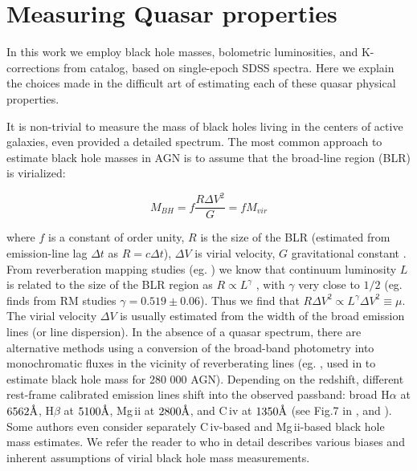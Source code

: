 \documentclass[twocolumn]{aastex62}
\let\oldAA\AA
\renewcommand{\AA}{\text{\normalfont\oldAA}}
\begin{document}
\appendix
\section{Measuring Quasar properties} 
\label{app:measureBHmass}
In this work we employ black hole masses, bolometric luminosities, and K-corrections from \cite{shen2011} catalog, based on single-epoch SDSS spectra. Here we explain the choices made in the difficult art of estimating each of these quasar physical properties.

It is non-trivial to measure the mass of black holes living in the centers of active galaxies, even provided a detailed spectrum. The most common  approach to estimate black hole masses in AGN is to assume that the broad-line region (BLR) is virialized:


\begin{equation}
M_{BH} = f \frac{ R\Delta V^{2} }{G} = f M_{vir}
\end{equation}


where $f$ is a constant of order unity, $R$ is the size of the BLR (estimated from  emission-line lag $\Delta t$ as $R = c \Delta t$), $\Delta V$ is virial velocity, $G$ gravitational constant \citep{shen2008}.  From reverberation mapping studies (eg. \citealt{shen2019}) we know that continuum luminosity $L$ is related to the size of the BLR region as $R \propto L^{\gamma}$ \citep{vestergaard2006}, with $\gamma$ very close to $1/2$ (eg. \citealt{bentz2009} finds from RM studies $\gamma = 0.519 \pm 0.06$). Thus we find  that $R \Delta V^{2} \propto L^{\gamma} \Delta V^{2} \equiv \mu$. The virial velocity $\Delta V$ is usually estimated from the width of the broad emission lines (or line dispersion).  In the absence of a quasar spectrum, there are alternative methods using a conversion of the broad-band photometry into monochromatic fluxes in the vicinity of reverberating lines (eg. \citealt{kozlowski2015}, used in \citealt{kozlowski2017b} to estimate black hole mass for 280 000 AGN).   
Depending on the redshift, different rest-frame calibrated emission lines shift into the observed passband: broad H$\alpha$ at  $6562\mbox{\AA}$, H$\beta$ at  $5100 \mbox{\AA}$, Mg\,{\sc ii} at $2800\mbox{\AA}$, and C\,{\sc iv} at $1350\mbox{\AA}$ (see Fig.7 in \citealt{shen2019}, and \citealt{vestergaard2002}). Some authors even consider separately C\,{\sc iv}-based and  Mg\,{\sc ii}-based  black hole mass estimates. We refer the reader to \citet{shen2008} who in detail describes various biases and inherent assumptions of virial black hole mass measurements. 
\end{document}
